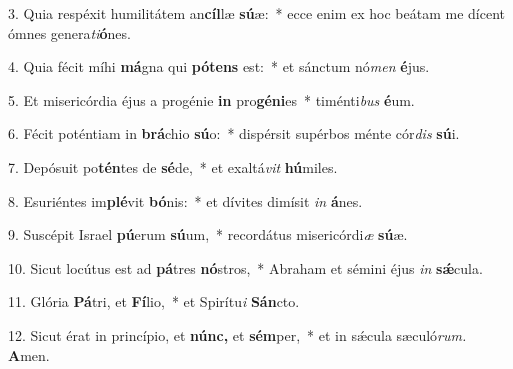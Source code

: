 \item 3. Quia respéxit humilitátem an\textbf{cíl}læ \textbf{sú}æ:~* ecce enim ex hoc beátam me dícent ómnes genera\textit{ti}\textbf{ó}nes.

\item 4. Quia fécit míhi \textbf{má}gna qui \textbf{pótens} est:~* et sánctum nó\textit{men} \textbf{é}jus.

\item 5. Et misericórdia éjus a progénie \textbf{in} pro\textbf{géni}es~* timénti\textit{bus}  \textbf{é}um.

\item 6. Fécit poténtiam in \textbf{brá}chio \textbf{sú}o:~* dispérsit supérbos ménte cór\textit{dis} \textbf{sú}i.

\item 7. Depósuit po\textbf{tén}tes de \textbf{sé}de,~* et exaltá\textit{vit} \textbf{hú}miles.

\item 8. Esuriéntes im\textbf{plé}vit \textbf{bó}nis:~* et dívites dimísit \textit{in} \textbf{á}nes.

\item 9. Suscépit Israel \textbf{pú}erum \textbf{sú}um,~* recordátus misericórdi\textit{æ} \textbf{sú}æ.

\item 10. Sicut locútus est ad \textbf{pá}tres \textbf{nó}stros,~* Abraham et sémini éjus \textit{in} \textbf{sǽ}cula.

\item 11. Glória \textbf{Pá}tri, et \textbf{Fí}lio,~* et Spirítu\textit{i} \textbf{Sán}cto.

\item 12. Sicut érat in princípio, et \textbf{núnc,} et \textbf{sém}per,~* et in sǽcula sæculó\textit{rum.} \textbf{A}men.